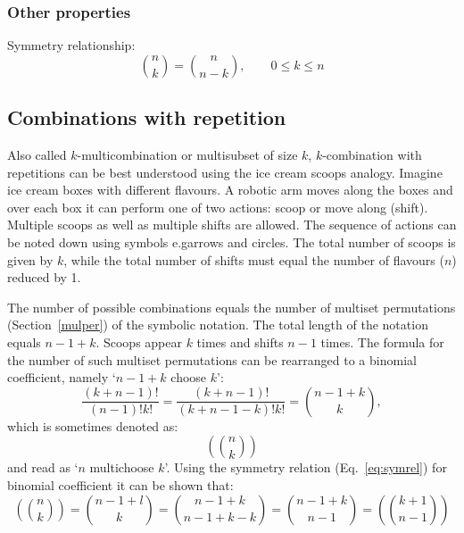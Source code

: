 \documentclass{article}
\makeatletter
\newcommand*{\eg}{e.g\@ifnextchar{.}{}{.\@\xspace}}
\makeatother
\begin{document}
\subsubsection{Other properties}

Symmetry relationship:
%
\begin{equation}
    \label{eq:symrel}
    \binom{n}{k} = \binom{n}{n-k}, \qquad 0 \le k \le n
\end{equation}

\subsection{Combinations with repetition}

Also called $k$\nobreakdash-\hspace{0pt}multicombination or multisubset of size $k$, $k$\nobreakdash-\hspace{0pt}combination with repetitions can be best understood using the ice cream scoops analogy.\cite{mathsisfun}
Imagine ice cream boxes with different flavours.
A robotic arm moves along the boxes and over each box it can perform one of two actions: scoop or move along (shift).
Multiple scoops as well as multiple shifts are allowed.
The sequence of actions can be noted down using symbols \eg arrows and circles.
The total number of scoops is given by $k$, while the total number of shifts must equal the number of flavours ($n$) reduced by 1.

The number of possible combinations equals the number of multiset permutations (Section~\ref{mulper}) of the symbolic notation.
The total length of the notation equals $n-1+k$.
Scoops appear $k$ times and shifts $n-1$ times.
The formula for the number of such multiset permutations can be rearranged to a binomial coefficient, namely `$n-1+k$ choose $k$':
%
\begin{equation}
    \frac{(k+n-1)!}{(n-1)!k!} = \frac{(k+n-1)!}{(k+n-1-k)!k!} = \binom{n-1+k}{k},
\end{equation}
%
which is sometimes denoted as:
%
\begin{equation*}
    \left(\!\!\!\binom{n}{k}\!\!\!\right)
\end{equation*}
%
and read as `$n$ multichoose $k$'. Using the symmetry relation (Eq.~\ref{eq:symrel}) for binomial coefficient it can be shown that:
%
\begin{equation}
    \left(\!\!\!\binom{n}{k}\!\!\!\right) = \binom{n-1+l}{k} = \binom{n-1+k}{n-1+k-k} = \binom{n-1+k}{n-1} = \left(\!\!\!\binom{k+1}{n-1}\!\!\!\right)
\end{equation}
\end{document}
